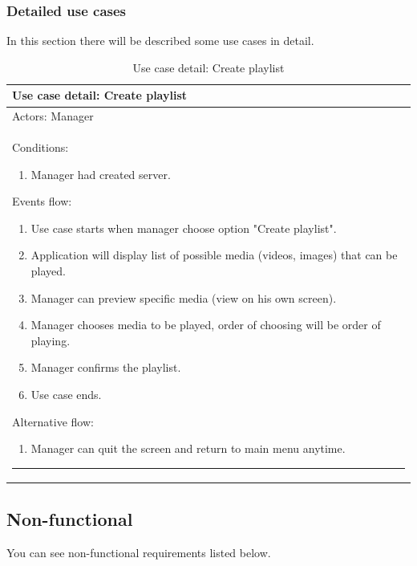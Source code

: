 \subsubsection{Detailed use cases}
In this section there will be described some use cases in detail.
\begin{table}[!h]
	\def\arraystretch{1.25}
	\caption{Use case detail: Create playlist}
	\label{tab:usecase1}
	
	\begin{tabular}{p{\textwidth}}
		\toprule
		\textbf{Use case detail: Create playlist} \\
		\midrule
		Actors: Manager \\
		Conditions:
		\begin{enumerate}
			\item Manager had created server.
		\end{enumerate}
		Events flow:
		\begin{enumerate}
			\item Use case starts when manager choose option "Create playlist".
			\item Application will display list of possible media (videos, images) that can be played.
			\item Manager can preview specific media (view on his own screen).
			\item Manager chooses media to be played, order of choosing will be order of playing.
			\item Manager confirms the playlist.
			\item Use case ends.
		\end{enumerate}
		Alternative flow:
		\begin{enumerate}
			\item Manager can quit the screen and return to main menu anytime.
		\end{enumerate}
		\vspace{0.6em}
		\hrule
	\end{tabular}
\end{table}

\subsection{Non-functional}

You can see non-functional requirements listed below.

